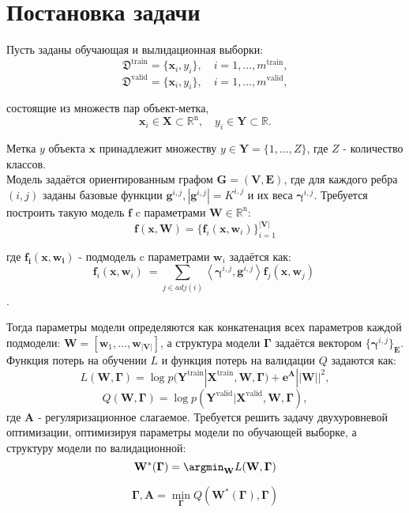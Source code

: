 \documentclass[12pt,twoside]{article}
\begin{document}
\section{Постановка задачи}

Пусть заданы обучающая и вылидационная выборки:
\[
\mathfrak{D}^{\text{train}} = \{\mathbf{x}_i, y_i\}, \quad i=1,\dots,m^{\text{train}},
\]
\[
\mathfrak{D}^{\text{valid}} = \{\mathbf{x}_i, y_i\}, \quad i=1,\dots,m^{\text{valid}},
\]

состоящие из множеств пар объект-метка,
\[
\mathbf{x}_i\in\mathbf{X}\subset\mathbb{R}^{\text{n}},\quad y_i\in\mathbf{Y}\subset\mathbb{R}.
\] 

Метка $y$ объекта $\mathbf{x}$ принадлежит множеству $y\in\mathbf{Y}= \{1,\dots,Z\}$, где $Z$ - количество классов.
\\

Модель задаётся ориентированным графом $\mathbf{G=(V,E)}$, где для каждого ребра $(i,j)$ заданы базовые функции $\mathbf{g}^{i,j}, |\mathbf{g}^{i,j}| = K^{i,j}$ и их веса $\boldsymbol{\gamma}^{i,j}$. Требуется построить такую модель $\mathbf{f}$ c параметрами $\mathbf{W}\in\mathbb{R}^\text{n}$:
\[
\mathbf{f}(\mathbf{x}, \mathbf{W})= \{ \mathbf{f}_i(\mathbf{x}, \mathbf{w}_i)\}_{i=1}^\mathbf{|V|}
\]

где $\mathbf{f_i(x, w_i)}$ - подмодель c параметрами $\mathbf{w}_i$ задаётся как:
\[
\mathbf{f}_i(\mathbf{x}, \mathbf{w}_i)\ = \sum_{j\in adj(i)} \left\langle {\boldsymbol{\gamma}^{i,j}, \mathbf{g}^{i,j}} \right\rangle \mathbf{f}_j(\mathbf{x}, \mathbf{w}_j)\
\].

Тогда параметры модели определяются как конкатенация всех параметров каждой подмодели: $\mathbf{W}=[\mathbf{w}_1,\dots,\mathbf{w}_\mathbf{|V|}]$, а структура модели $\boldsymbol{\Gamma}$ задаётся вектором $\{ \boldsymbol{\gamma}^{i,j}\}_\mathbf{E}$.
\\

Функция потерь на обучении $L$ и функция потерь на валидации $Q$ задаются как:
\[
L (\mathbf{W}, \boldsymbol{\Gamma})= \log p(\mathbf{Y}^\text{train}|\mathbf{X}^\text{train}, \mathbf{W}, \boldsymbol{\Gamma}) + \boldsymbol{e}^{\mathbf{A}}||\mathbf{W}||^2,
\]
\[
Q (\mathbf{W}, \boldsymbol{\Gamma})= \log p(\mathbf{Y}^\text{valid}|\mathbf{X}^\text{valid}, \mathbf{W}, \boldsymbol{\Gamma}),
\]
где $\mathbf{A}$ - регуляризационное слагаемое. Требуется решить задачу двухуровневой оптимизации, оптимизируя параметры модели по обучающей выборке, а структуру модели по валидационной: 
\[
\mathbf{W}^*( \boldsymbol{\Gamma}) = \argmin_{\mathbf{W}}
L (\mathbf{W}, \boldsymbol{\Gamma})\]

\[
\boldsymbol{\Gamma}, \mathbf{A} = \min_{\boldsymbol{\Gamma}} Q (\mathbf{W}^*( \boldsymbol{\Gamma}), \boldsymbol{\Gamma})
\]



\end{document}
